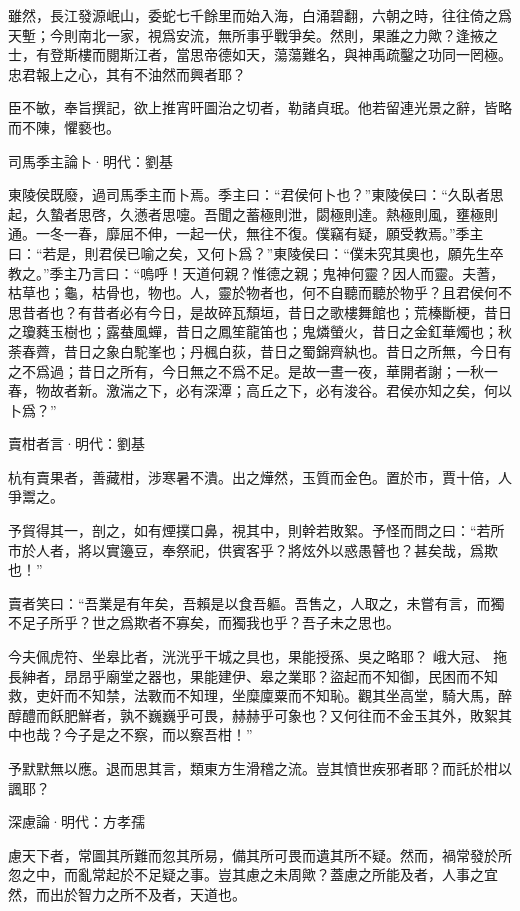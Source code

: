 \documentclass[12pt,a4paper]{ctexbook}
\begin{document}
雖然，長江發源岷山，委蛇七千餘里而始入海，白涌碧翻，六朝之時，往往倚之爲天塹；今則南北一家，視爲安流，無所事乎戰爭矣。然則，果誰之力歟？逢掖之士，有登斯樓而閱斯江者，當思帝德如天，蕩蕩難名，與神禹疏鑿之功同一罔極。忠君報上之心，其有不油然而興者耶？\par
臣不敏，奉旨撰記，欲上推宵旰圖治之切者，勒諸貞珉。他若留連光景之辭，皆略而不陳，懼褻也。\par
司馬季主論卜·明代：劉基 \par
東陵侯既廢，過司馬季主而卜焉。季主曰：“君侯何卜也？”東陵侯曰：“久臥者思起，久蟄者思啓，久懣者思嚏。吾聞之蓄極則泄，閟極則達。熱極則風，壅極則通。一冬一春，靡屈不伸，一起一伏，無往不復。僕竊有疑，願受教焉。”季主曰：“若是，則君侯已喻之矣，又何卜爲？”東陵侯曰：“僕未究其奧也，願先生卒教之。”季主乃言曰：“嗚呼！天道何親？惟德之親；鬼神何靈？因人而靈。夫蓍，枯草也；龜，枯骨也，物也。人，靈於物者也，何不自聽而聽於物乎？且君侯何不思昔者也？有昔者必有今日，是故碎瓦頹垣，昔日之歌樓舞館也；荒榛斷梗，昔日之瓊蕤玉樹也；露蛬風蟬，昔日之鳳笙龍笛也；鬼燐螢火，昔日之金釭華燭也；秋荼春薺，昔日之象白駝峯也；丹楓白荻，昔日之蜀錦齊紈也。昔日之所無，今日有之不爲過；昔日之所有，今日無之不爲不足。是故一晝一夜，華開者謝；一秋一春，物故者新。激湍之下，必有深潭；高丘之下，必有浚谷。君侯亦知之矣，何以卜爲？”\par
賣柑者言·明代：劉基 \par
杭有賣果者，善藏柑，涉寒暑不潰。出之燁然，玉質而金色。置於市，賈十倍，人爭鬻之。\par
予貿得其一，剖之，如有煙撲口鼻，視其中，則幹若敗絮。予怪而問之曰：“若所市於人者，將以實籩豆，奉祭祀，供賓客乎？將炫外以惑愚瞽也？甚矣哉，爲欺也！”\par
賣者笑曰：“吾業是有年矣，吾賴是以食吾軀。吾售之，人取之，未嘗有言，而獨不足子所乎？世之爲欺者不寡矣，而獨我也乎？吾子未之思也。\par
今夫佩虎符、坐皋比者，洸洸乎干城之具也，果能授孫、吳之略耶？ 峨大冠、 拖長紳者，昂昂乎廟堂之器也，果能建伊、皋之業耶？盜起而不知御，民困而不知救，吏奸而不知禁，法斁而不知理，坐糜廩粟而不知恥。觀其坐高堂，騎大馬，醉醇醴而飫肥鮮者，孰不巍巍乎可畏，赫赫乎可象也？又何往而不金玉其外，敗絮其中也哉？今子是之不察，而以察吾柑！”\par
予默默無以應。退而思其言，類東方生滑稽之流。豈其憤世疾邪者耶？而託於柑以諷耶？\par
深慮論·明代：方孝孺 \par
慮天下者，常圖其所難而忽其所易，備其所可畏而遺其所不疑。然而，禍常發於所忽之中，而亂常起於不足疑之事。豈其慮之未周歟？蓋慮之所能及者，人事之宜然，而出於智力之所不及者，天道也。\par
\end{document}
